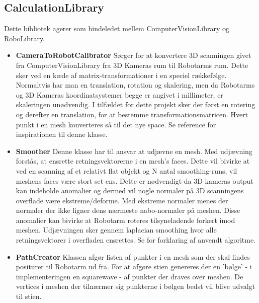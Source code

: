 \subsection{CalculationLibrary}{\label {calculationlibraryafsnit}
Dette bibliotek agerer som bindeledet mellem ComputerVisionLibrary og RoboLibrary.

\begin{itemize}
\item{\textbf{CameraToRobotCalibrator}} \newline
Sørger for at konvertere 3D scanningen givet fra ComputerVisionLibrary fra 3D Kameras rum til Robotarms rum.
Dette sker ved en kæde af matrix-transformationer i en speciel rækkefølge. 
Normaltvis har man en translation, rotation og skalering, men da Robotarms og 3D Kameras koordinatsystemer begge er angivet i millimeter, er skaleringen unødvendig.
I tilfældet for dette projekt sker der først en rotering og derefter en translation, for at bestemme transformationsmatricen. 
Hvert punkt i en mesh konverteres så til det nye space. Se reference \cite{RumTransformation} for inspirationen til denne klasse.

\item{\textbf{Smoother}}\newline
Denne klasse har til ansvar at udjævne en mesh. Med udjævning forstås, at ensrette retningsvektorerne i en mesh's faces. Dette vil bivirke at ved en scanning af et relativt flat objekt og N antal smoothing-runs, vil meshens faces være stort set ens.
Dette er nødvendigt da 3D kameras output kan indeholde anomalier og dermed vil nogle normaler på 3D scanningens overflade være ekstreme/deforme. Med ekstreme normaler menes der normaler der ikke ligner dens nærmeste nabo-normaler på meshen. Disse anomalier kan bivirke at Robotarm roteres tilsyneladende forkert imod meshen. Udjævningen sker gennem laplacian smoothing hvor alle retningsvektorer i overfladen ensrettes. Se \cite{Smooth} for forklaring af anvendt algoritme.

\item{\textbf{PathCreator}}\newline
Klassen afgør listen af punkter i en mesh som der skal findes positurer til Robotarm ud fra.
For at afgøre stien genereres der en 'bølge' - i implementeringen en squarewave - af punkter der draves over meshen.
De vertices i meshen der tilnærmer sig punkterne i bølgen bedst vil blive udvalgt til stien.


\end{itemize}}
